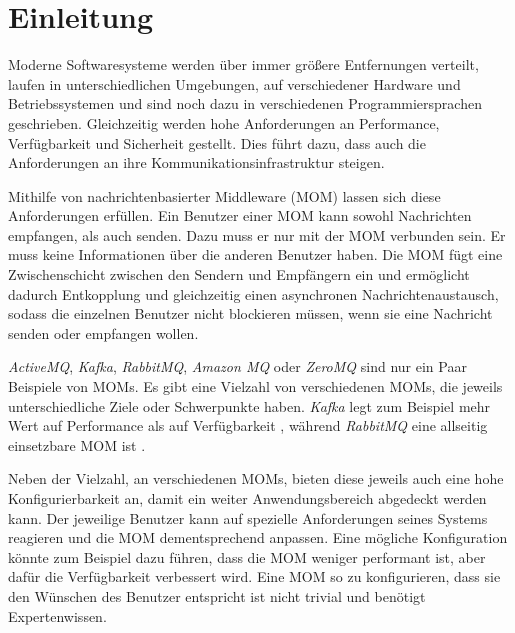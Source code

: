 
\chapter{Einleitung}
\label{ch:Introduction}
Moderne Softwaresysteme werden über immer größere Entfernungen verteilt, laufen in unterschiedlichen Umgebungen, auf verschiedener Hardware und Betriebssystemen und sind noch dazu in verschiedenen Programmiersprachen geschrieben. Gleichzeitig werden hohe Anforderungen an Performance, Verfügbarkeit und Sicherheit gestellt. Dies führt dazu, dass auch die Anforderungen an ihre Kommunikationsinfrastruktur steigen. \par
Mithilfe von nachrichtenbasierter Middleware (MOM) lassen sich diese Anforderungen erfüllen. Ein Benutzer einer MOM kann sowohl Nachrichten empfangen, als auch senden. Dazu muss er nur mit der MOM verbunden sein. Er muss keine Informationen über die anderen Benutzer haben. Die MOM fügt eine Zwischenschicht zwischen den Sendern und Empfängern ein und ermöglicht dadurch Entkopplung und gleichzeitig einen asynchronen Nachrichtenaustausch, sodass die einzelnen Benutzer nicht blockieren müssen, wenn sie eine Nachricht senden oder empfangen wollen. \par
\emph{ActiveMQ}, \emph{Kafka}, \emph{RabbitMQ}, \emph{Amazon MQ} oder \emph{ZeroMQ} sind nur ein Paar Beispiele von MOMs. Es gibt eine Vielzahl von verschiedenen MOMs, die jeweils unterschiedliche Ziele oder Schwerpunkte haben. \emph{Kafka} legt zum Beispiel mehr Wert auf Performance als auf Verfügbarkeit \cite{kafka}, während \emph{RabbitMQ} eine allseitig einsetzbare MOM ist \cite{rabbitmq}. \par
Neben der Vielzahl, an verschiedenen MOMs, bieten diese jeweils auch eine hohe Konfigurierbarkeit an, damit ein weiter Anwendungsbereich abgedeckt werden kann. Der jeweilige Benutzer kann auf spezielle Anforderungen seines Systems reagieren und die MOM dementsprechend anpassen. Eine mögliche Konfiguration könnte zum Beispiel dazu führen, dass die MOM weniger performant ist, aber dafür die Verfügbarkeit verbessert wird. Eine MOM so zu konfigurieren, dass sie den Wünschen des Benutzer entspricht ist nicht trivial und benötigt Expertenwissen. 

